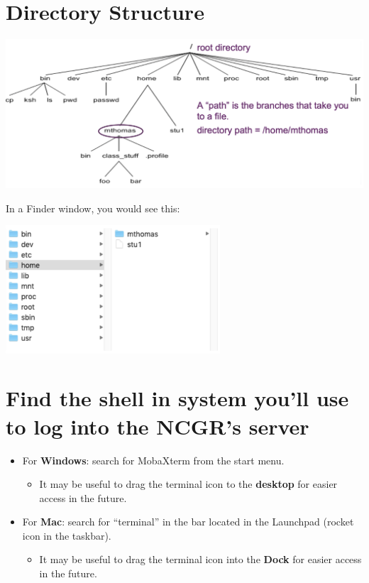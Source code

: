 \documentclass[
]{book}
\providecommand{\tightlist}{%
  \setlength{\itemsep}{0pt}\setlength{\parskip}{0pt}}
\begin{document}
\hypertarget{directory-structure}{%
\section{Directory Structure}\label{directory-structure}}

\includegraphics[width=1\textwidth,height=\textheight]{./Figures/DirectoryStructure.png}

In a Finder window, you would see this:

\includegraphics[width=0.6\textwidth,height=\textheight]{./Figures/FinderWindow.png}

\hypertarget{find-the-shell-in-system-youll-use-to-log-into-the-ncgrs-server}{%
\section{Find the shell in system you'll use to log into the NCGR's server}\label{find-the-shell-in-system-youll-use-to-log-into-the-ncgrs-server}}

\begin{itemize}
\tightlist
\item
  For \textbf{Windows}: search for MobaXterm from the start menu.

  \begin{itemize}
  \tightlist
  \item
    It may be useful to drag the terminal icon to the \textbf{desktop} for easier access in the future.
  \end{itemize}
\item
  For \textbf{Mac}: search for ``terminal'' in the bar located in the Launchpad (rocket icon in the taskbar).

  \begin{itemize}
  \tightlist
  \item
    It may be useful to drag the terminal icon into the \textbf{Dock} for easier access in the future.
  \end{itemize}
\end{itemize}
\end{document}
